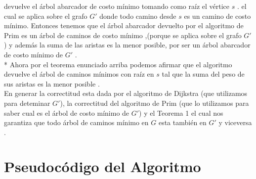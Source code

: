\documentclass{article}
\begin{document}
    \vspace*{0.5cm} 

    devuelve el \'arbol abarcador de costo m\'inimo tomando como ra\'iz el v\'ertice $s$ . el cual se aplica sobre el grafo $G'$ donde todo camino desde $s$ es un camino de  costo m\'inimo.
    Entonces tenemos que el \'arbol abarcador devuelto por el algoritmo de Prim es un \'arbol de caminos de costo m\'inimo ,(porque se aplica sobre el grafo $G'$ ) y adem\'as la suma de las aristas es la 
    menor posible, por ser un \'arbol abarcador de costo m\'inimo de $G'$ . 
    \\*
    Ahora por el teorema enunciado arriba podemos afirmar que el algoritmo devuelve el \'arbol de  caminos m\'inimos con ra\'iz en $s$ tal que la suma del peso de sus aristas es la menor posible . 
    \\
    En generar la correctitud esta dada por el algoritmo de Dijkstra (que utilizamos para deteminar $G'$), la correctitud del algoritmo de Prim (que lo utilizamos para saber cual es el \'arbol de costo m\'inimo de $G'$) y el Teorema 1 el cual nos 
    garantiza que todo \'arbol de caminos m\'inimo  en $G$ esta tambi\'en en $G'$ y viceversa . 

    \section{Pseudoc\'odigo del Algoritmo }
\end{document}

